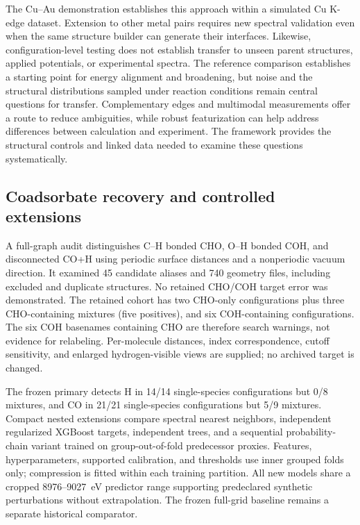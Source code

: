 \documentclass[11pt,a4paper]{article}
\newcommand{\ca}{Cu--Au}
\begin{document}
The \ca{} demonstration establishes this approach within a simulated Cu K-edge dataset. Extension to other metal pairs requires new spectral validation even when the same structure builder can generate their interfaces. Likewise, configuration-level testing does not establish transfer to unseen parent structures, applied potentials, or experimental spectra. The reference comparison establishes a starting point for energy alignment and broadening, but noise and the structural distributions sampled under reaction conditions remain central questions for transfer. Complementary edges and multimodal measurements offer a route to reduce ambiguities,\cite{jia2026} while robust featurization can help address differences between calculation and experiment.\cite{chen2024} The framework provides the structural controls and linked data needed to examine these questions systematically.

\subsection{Coadsorbate recovery and controlled extensions}
A full-graph audit distinguishes C--H bonded CHO, O--H bonded COH, and disconnected CO+H using periodic surface distances and a nonperiodic vacuum direction. It examined 45 candidate aliases and 740 geometry files, including excluded and duplicate structures. No retained CHO/COH target error was demonstrated. The retained cohort has two CHO-only configurations plus three CHO-containing mixtures (five positives), and six COH-containing configurations. The six COH basenames containing CHO are therefore search warnings, not evidence for relabeling. Per-molecule distances, index correspondence, cutoff sensitivity, and enlarged hydrogen-visible views are supplied; no archived target is changed.

The frozen primary detects H in 14/14 single-species configurations but 0/8 mixtures, and CO in 21/21 single-species configurations but 5/9 mixtures. Compact nested extensions compare spectral nearest neighbors, independent regularized XGBoost targets, independent trees, and a sequential probability-chain variant trained on group-out-of-fold predecessor proxies. Features, hyperparameters, supported calibration, and thresholds use inner grouped folds only; compression is fitted within each training partition. All new models share a cropped 8976--9027~eV predictor range supporting predeclared synthetic perturbations without extrapolation. The frozen full-grid baseline remains a separate historical comparator.
\end{document}
